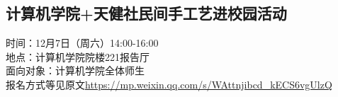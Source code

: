 \documentclass[letterpaper, 12pt]{article}
\begin{document}
\begin{multicols}{2}
\section{计算机学院+天健社民间手工艺进校园活动}
时间：12月7日（周六）14:00-16:00\\
地点：计算机学院院楼221报告厅\\
面向对象：计算机学院全体师生\\
报名方式等见原文\url{https://mp.weixin.qq.com/s/WAttnjibcd_kECS6vgUlzQ}
\end{multicols} 
\end{document}
